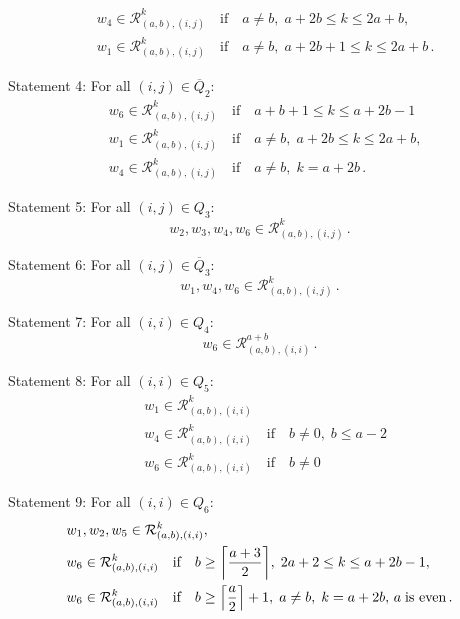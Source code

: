 \documentclass[a4paper,11pt]{article}
\DeclarePairedDelimiter\ceil{\lceil}{\rceil}
\theoremstyle{plain}
\theoremstyle{definition}
\begin{document}
\begin{description}[wide, labelwidth=!, labelindent=0pt]
\begin{align}
    &w_4\in \mathcal{R}^k_{(a,b),(i,j)} \quad \text{if}\quad a\neq b,\; a+2b\leq k\leq 2a+b,\\
    & w_1\in \mathcal{R}^k_{(a,b),(i,j)} \quad\text{if}\quad a\neq b,\; a+2b+1\leq k\leq 2a+b\,.
\end{align}
\item{Statement 4:} For all $(i,j)\in \overline{Q}_2$:
\begin{align}
    &w_6\in \mathcal{R}^k_{(a,b),(i,j)} \quad \text{if}\quad a+b+1\leq k\leq a+2b-1\\
    & w_1\in \mathcal{R}^k_{(a,b),(i,j)} \quad \text{if}\quad a\neq b,\; a+2b\leq k\leq 2a+b,\\
    & w_4\in  \mathcal{R}^k_{(a,b),(i,j)} \quad \text{if}\quad a\neq b,\;k=a+2b\,.
\end{align}
\item{Statement 5:} For all $(i,j)\in Q_3$:
\begin{equation}
    w_2,w_3,w_4,w_6\in  \mathcal{R}^k_{(a,b),(i,j)}\,.
\end{equation}
\item{Statement 6:} For all $(i,j)\in \overline{Q}_3$:
\begin{equation}
    w_1,w_4,w_6\in  \mathcal{R}^k_{(a,b),(i,j)}\,.
\end{equation}
\item{Statement 7:} For all $(i,i)\in Q_4$:
\begin{equation}
    w_6\in  \mathcal{R}^{a+b}_{(a,b),(i,i)}\,.
\end{equation}
\item{Statement 8:} For all $(i,i)\in Q_5$:
\begin{align}
    &w_1 \in  \mathcal{R}^k_{(a,b),(i,i)} \\
    & w_4\in  \mathcal{R}^k_{(a,b),(i,i)} \quad \text{if} \quad b\neq0,\; b\leq a-2 \\
    & w_6 \in  \mathcal{R}^k_{(a,b),(i,i)} \quad \text{if} \quad b\neq 0
\end{align}
\item{Statement 9:} For all $(i,i)\in Q_6$:
\begin{align}
    &w_1,w_2,w_5\in  \mathcal{R}^k_{(a,b),(i,i)},\\
    & w_6 \in  \mathcal{R}^k_{(a,b),(i,i)} \quad\text{if}\quad b\geq \ceil*{\frac{a+3}{2}},\;2a+2\leq k\leq a+2b-1,\\
    & w_6\in  \mathcal{R}^k_{(a,b),(i,i)} \quad\text{if}\quad b\geq \ceil*{\frac{a}{2}}+1,\;a\neq b,\; k=a+2b,\, a \;\text{is even}\,.
\end{align}

\end{description}
\end{document}
